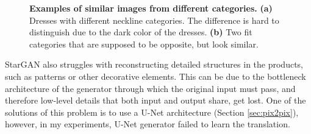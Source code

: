 \documentclass[12pt]{report}
\begin{document}
\begin{figure}[h]
\centering
{}
\vspace{0.2cm}
\caption{\label{fig:problem_data} \textbf{Examples of similar images from different categories.} \textbf{(a)} Dresses with different neckline categories. The difference is hard to distinguish due to the dark color of the dresses. \textbf{(b)} Two fit categories that are supposed to be opposite, but look similar.}
\end{figure}

StarGAN also struggles with reconstructing detailed structures in the products, such as patterns or other decorative elements. This can be due to the bottleneck architecture of the generator through which the original input must pass, and therefore low-level details that both input and output share, get lost. One of the solutions of this problem is to use a U-Net architecture (Section \ref{sec:pix2pix}), however, in my experiments, U-Net generator failed to learn the translation.
\end{document}
